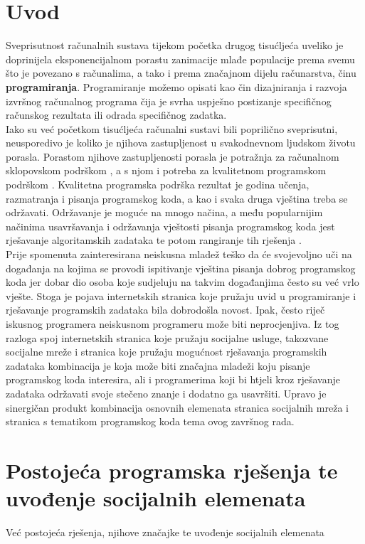 \documentclass[times, utf8, zavrsni]{fer}
\begin{document}
\chapter{Uvod}
Sveprisutnost računalnih sustava tijekom početka drugog tisućljeća uveliko je doprinijela eksponencijalnom porastu zanimacije mlađe populacije prema svemu što je povezano s računalima, a tako i prema značajnom dijelu računarstva, činu \textbf{programiranja}. Programiranje  možemo opisati kao čin dizajniranja i razvoja izvršnog računalnog programa čija je svrha uspješno postizanje specifičnog računskog rezultata ili odrada specifičnog zadatka.\\
Iako su već početkom tisućljeća računalni sustavi bili poprilično sveprisutni, neusporedivo je koliko je njihova zastupljenost u svakodnevnom ljudskom životu porasla. Porastom njihove zastupljenosti porasla je potražnja za računalnom sklopovskom podrškom , a s njom i potreba za kvalitetnom programskom podrškom . Kvalitetna programska podrška rezultat je godina učenja, razmatranja i pisanja programskog koda, a kao i svaka druga vještina treba se održavati. Održavanje je moguće na mnogo načina, a među popularnijim načinima usavršavanja i održavanja vještosti pisanja programskog koda jest rješavanje algoritamskih zadataka te potom rangiranje tih rješenja .\\
Prije spomenuta zainteresirana neiskusna mladež teško da će svojevoljno uči na događanja na kojima se provodi ispitivanje vještina pisanja dobrog programskog koda jer dobar dio osoba koje sudjeluju na takvim događanjima često su već vrlo vješte. Stoga je pojava internetskih stranica koje pružaju uvid u programiranje i rješavanje programskih zadataka bila dobrodošla novost. Ipak, često riječ iskusnog programera neiskusnom programeru može biti neprocjenjiva. Iz tog razloga spoj internetskih stranica koje pružaju socijalne usluge, takozvane socijalne mreže  i stranica koje pružaju mogućnost rješavanja programskih zadataka kombinacija je koja može biti značajna mladeži koju pisanje programskog koda interesira, ali i programerima koji bi htjeli kroz rješavanje zadataka održavati svoje stečeno znanje i dodatno ga usavršiti. Upravo je sinergičan produkt kombinacija osnovnih elemenata stranica socijalnih mreža i stranica s tematikom programskog koda tema ovog završnog rada.

\chapter{Postojeća programska rješenja te uvođenje socijalnih elemenata}
Već postojeća rješenja, njihove značajke te uvođenje socijalnih elemenata
\end{document}
